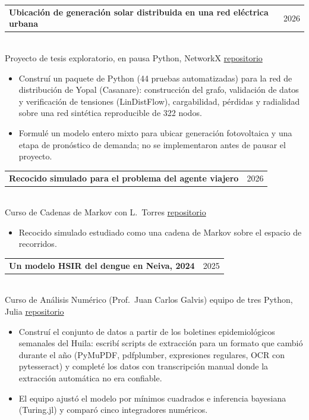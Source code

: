 \documentclass[11pt,a4paper]{article}
\makeatletter
\newcommand{\entry}[3]{%
  \begin{tabularx}{\textwidth}{@{}>{\raggedright\arraybackslash}X@{\hspace{1em}}r@{}}
    \textbf{#1} & {\color{gris}#2}
  \end{tabularx}\\
  {\color{gris}\small #3}\par\vspace{2pt}}
\makeatother
\begin{document}
\entry{Ubicaci\'on de generaci\'on solar distribuida en una red el\'ectrica urbana}{2026}{Proyecto de tesis
  exploratorio, en pausa \textperiodcentered{} Python, NetworkX \textperiodcentered{}
  \href{https://github.com/Henry2899/pvgraph}{repositorio}}
\begin{itemize}
  \item Constru\'i un paquete de Python (44 pruebas automatizadas) para la red de distribuci\'on de Yopal
        (Casanare): construcci\'on del grafo, validaci\'on de datos y verificaci\'on de tensiones
        (LinDistFlow), cargabilidad, p\'erdidas y radialidad sobre una red sint\'etica reproducible de
        322 nodos.
  \item Formul\'e un modelo entero mixto para ubicar generaci\'on fotovoltaica y una etapa de pron\'ostico
        de demanda; no se implementaron antes de pausar el proyecto.
\end{itemize}

\entry{Recocido simulado para el problema del agente viajero}{2026}{Curso de Cadenas de Markov
  \textperiodcentered{} con L.\ Torres \textperiodcentered{}
  \href{https://github.com/Henry2899/cadenas-markov-aplicaciones}{repositorio}}
\begin{itemize}
  \item Recocido simulado estudiado como una cadena de Markov sobre el espacio de recorridos.
\end{itemize}

\entry{Un modelo HSIR del dengue en Neiva, 2024}{2025}{Curso de An\'alisis Num\'erico (Prof.\ Juan Carlos
  Galvis) \textperiodcentered{} equipo de tres \textperiodcentered{} Python, Julia \textperiodcentered{}
  \href{https://github.com/Henry2899/dengue-hsir-neiva}{repositorio}}
\begin{itemize}
  \item Constru\'i el conjunto de datos a partir de los boletines epidemiol\'ogicos semanales del Huila:
        escrib\'i scripts de extracci\'on para un formato que cambi\'o durante el a\~no (PyMuPDF,
        pdfplumber, expresiones regulares, OCR con pytesseract) y complet\'e los datos con transcripci\'on
        manual donde la extracci\'on autom\'atica no era confiable.
  \item El equipo ajust\'o el modelo por m\'inimos cuadrados e inferencia bayesiana (Turing.jl) y
        compar\'o cinco integradores num\'ericos.
\end{itemize}
\end{document}
